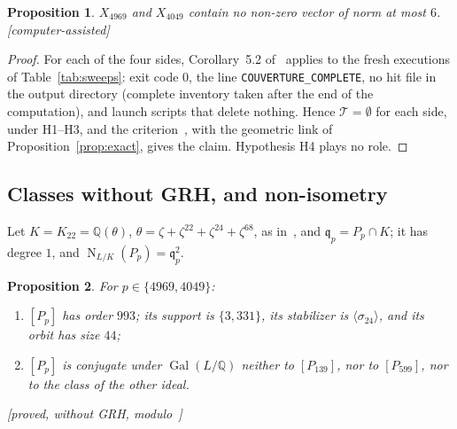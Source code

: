 \documentclass[11pt,a4paper]{amsart}
\theoremstyle{plain}
\newtheorem{proposition}{Proposition}[section]
\theoremstyle{definition}
\newcommand{\Q}{\mathbb{Q}}
\newcommand{\Tc}{\mathcal{T}}
\newcommand{\q}{\mathfrak{q}}
\DeclareMathOperator{\Nm}{N}
\DeclareMathOperator{\Gal}{Gal}
\newcommand{\st}[1]{\textup{\textsf{\small[#1]}}}
\newcommand{\ASS}{\st{computer-assisted}}
\begin{document}
\begin{proposition}\label{prop:sweeps}
$X_{4969}$ and $X_{4049}$ contain no non-zero vector of norm at most $6$. \ASS
\end{proposition}

\begin{proof}
For each of the four sides, Corollary~5.2 of~\cite{Gau26} applies to the fresh executions of Table~\ref{tab:sweeps}: exit code $0$, the line \texttt{COUVERTURE\_COMPLETE}, no hit file in the output directory (complete inventory taken after the end of the computation), and launch scripts that delete nothing. Hence $\Tc=\emptyset$ for each side, under H1--H3, and the criterion~\cite[Thm.~4.6]{Gau26}, with the geometric link of Proposition~\ref{prop:exact}, gives the claim. Hypothesis H4 plays no role.
\end{proof}

\subsection{Classes without GRH, and non-isometry}
Let $K=K_{22}=\Q(\theta)$, $\theta=\zeta+\zeta^{22}+\zeta^{24}+\zeta^{68}$, as in~\cite[\S6.4]{Gau26}, and $\q_p=P_p\cap K$; it has degree $1$, and $\Nm_{L/K}(P_p)=\q_p^2$.

\begin{proposition}\label{prop:classes}
For $p\in\{4969,4049\}$:
\begin{enumerate}[label=\textup{(\alph*)}]
\item $[P_p]$ has order $993$; its support is $\{3,331\}$, its stabilizer is $\langle\sigma_{24}\rangle$, and its orbit has size $44$;
\item $[P_p]$ is conjugate under $\Gal(L/\Q)$ neither to $[P_{139}]$, nor to $[P_{599}]$, nor to the class of the other ideal.
\end{enumerate}
\st{proved, without GRH, modulo~\cite[Prop.~2.2, 2.5]{Gau26}}
\end{proposition}
\end{document}
